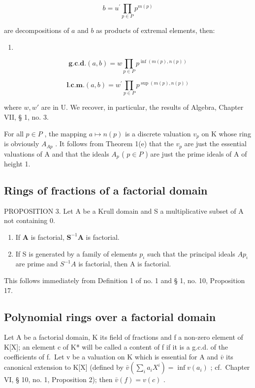 \[
b = u ^ {\prime} \prod_ {p \in P} p ^ {m (p)}
\]

are decompositions of \(a\) and \(b\) as products of extremal elements, then:

\begin{enumerate}
\def\labelenumi{(\arabic{enumi})}
\tightlist
\item
\end{enumerate}

\[
\mathbf {g . c . d .} (a, b) = w \prod_ {p \in P} p ^ {\inf (m (p), n (p))}\tag{2}
\]

\[
\mathbf {l . c . m .} (a, b) = w ^ {\prime} \prod_ {p \in P} p ^ {\sup (m (p), n (p))}
\]

where \(w, w'\) are in U. We recover, in particular, the results of Algebra, Chapter VII, § 1, no. 3.

For all \(p \in P\) , the mapping \(a \mapsto n(p)\) is a discrete valuation \(v_{p}\) on K whose ring is obviously \(A_{Ap}\) . It follows from Theorem 1(e) that the \(v_{p}\) are just the essential valuations of A and that the ideals \(A_{p}\) ( \(p \in P\) ) are just the prime ideals of A of height 1.

\subsection{Rings of fractions of a factorial domain}

PROPOSITION 3. Let A be a Krull domain and S a multiplicative subset of A not containing 0.

\begin{enumerate}
\def\labelenumi{(\roman{enumi})}
\item
  If \(\mathbf{A}\) is factorial, \(\mathbf{S}^{-1}\mathbf{A}\) is factorial.
\item
  If S is generated by a family of elements \(p_{\iota}\) such that the principal ideals \(Ap_{\iota}\) are prime and \(S^{-1}A\) is factorial, then A is factorial.
\end{enumerate}

This follows immediately from Definition 1 of no. 1 and § 1, no. 10, Proposition 17.

\subsection{Polynomial rings over a factorial domain}

Let A be a factorial domain, K its field of fractions and f a non-zero element of K{[}X{]}; an element c of K* will be called a content of f if it is a g.c.d. of the coefficients of f.~Let v be a valuation on K which is essential for A and \(\bar{v}\) its canonical extension to K{[}X{]} (defined by \(\bar{v}\left(\sum_{i}a_{i}X^{i}\right)=\inf v(a_{i})\) ; cf.~Chapter VI, § 10, no. 1, Proposition 2); then \(\bar{v}(f)=v(c)\) .

